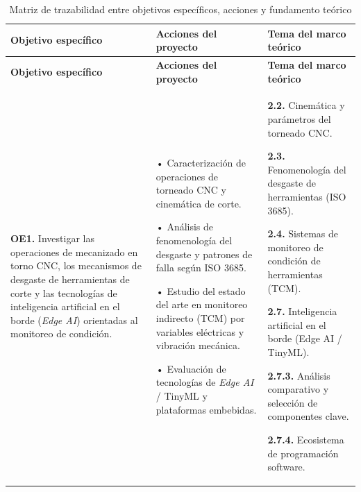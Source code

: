 {\footnotesize
{}
\setlength{\parskip}{1.5pt}
\setlength{\tabcolsep}{4.0pt}
\begin{longtable}{>{\raggedright\arraybackslash}p{3.3cm}>{\raggedright\arraybackslash}p{5.2cm}>{\raggedright\arraybackslash}p{5.2cm}}
\caption{Matriz de trazabilidad entre objetivos específicos, acciones y fundamento teórico\label{tab:contenido_tematico}}
\\
\hline
\textbf{Objetivo específico} & \textbf{Acciones del proyecto} & \textbf{Tema del marco teórico} \\
\hline \hline
\endfirsthead

\hline
\textbf{Objetivo específico} & \textbf{Acciones del proyecto} & \textbf{Tema del marco teórico} \\
\hline \hline
\endhead

\hline
\endfoot

\hline
\multicolumn{3}{c}{\textbf{Fuente:} Elaboración propia, 2026.}
\endlastfoot

\textbf{OE1.} Investigar las operaciones de mecanizado en torno CNC, los mecanismos de desgaste de herramientas de corte y las tecnologías de inteligencia artificial en el borde (\textit{Edge AI}) orientadas al monitoreo de condición. &
• Caracterización de operaciones de torneado CNC y cinemática de corte.\par\vspace{1mm}
• Análisis de fenomenología del desgaste y patrones de falla según ISO 3685.\par\vspace{1mm}
• Estudio del estado del arte en monitoreo indirecto (TCM) por variables eléctricas y vibración mecánica.\par\vspace{1mm}
• Evaluación de tecnologías de \textit{Edge AI} / TinyML y plataformas embebidas. &
\textbf{2.2.} Cinemática y parámetros del torneado CNC.\par\vspace{1mm}
\textbf{2.3.} Fenomenología del desgaste de herramientas (ISO 3685).\par\vspace{1mm}
\textbf{2.4.} Sistemas de monitoreo de condición de herramientas (TCM).\par\vspace{1mm}
\textbf{2.7.} Inteligencia artificial en el borde (Edge AI / TinyML).\par\vspace{1mm}
\textbf{2.7.3.} Análisis comparativo y selección de componentes clave.\par\vspace{1mm}
\textbf{2.7.4.} Ecosistema de programación software. \\ \hline


\end{longtable}}
